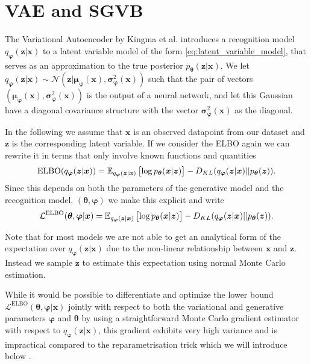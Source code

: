 \section{VAE and SGVB}

The Variational Autoencoder by Kingma et al. \cite{kingma_auto-encoding_2013}
introduces a recognition model $q_{\bm{\varphi}}(\bm{z} | \bm{x})$ to a latent
variable model of the form \eqref{eq:latent_variable_model}, that serves as
an approximation to the true posterior $p_{\bm{\theta}}( \bm{z} | \bm{x})$. We let $q_{\bm{\varphi}}(\bm{z} | \bm{x}) \sim
\mathcal{N}(\bm{z}| \bm{\mu_{\bm{\varphi}}}(\bm{x}),
\bm{\sigma}^2_{\bm{\varphi}}(\bm{x}))$ such that the pair of vectors
$(\bm{\mu}_{\bm{\varphi}}(\bm{x}), \bm{\sigma}^2_{\bm{\varphi}}(\bm{x}))$ is the
output of a neural network, and let this Gaussian have a diagonal covariance
structure with the vector $\bm{\sigma}^2_{\bm{\varphi}}(\bm{x})$ as the diagonal.

In the following we assume that $\bm{x}$ is an observed datapoint from our
dataset and $\bm{z}$ is the corresponding latent variable. If we consider the
ELBO again we can rewrite it in terms that only involve known functions and quantities
\begin{equation}
  \label{eq:ELBO_VAE}
  \text{ELBO}(q_{\bm{\varphi}}(\bm{z} | \bm{x})) = \operatorname{\mathbb{E}}_{q_{\bm{\varphi}}(\bm{z} | \bm{x})}\left[ \log p_{\bm{\theta}}(\bm{x} | \bm{z}) \right] - D_{KL}(q_{\bm{\varphi}}(\bm{z} | \bm{x}) || p_{\bm{\theta}}(\bm{z})).
\end{equation}
Since this depends on both the parameters of the generative model and the
recognition model, $(\bm{\theta}, \bm{\varphi})$ we make this explicit and write
\begin{equation}
  \label{eq:VAE_ELBO}
  \mathcal{L}^{\text{ELBO}}(\bm{\theta}, \bm{\varphi} | \bm{x}) = \operatorname{\mathbb{E}}_{q_{\bm{\varphi}}(\bm{z} | \bm{x})}\left[ \log p_{\bm{\theta}}(\bm{x} | \bm{z}) \right] - D_{KL}(q_{\bm{\varphi}}(\bm{z} | \bm{x}) || p_{\bm{\theta}}(\bm{z})).
\end{equation}

Note that for most models we are not able to get an analytical form of the
expectation over $q_{\bm{\varphi}}(\bm{z} | \bm{x})$ due to the non-linear
relationship between $\bm{x}$ and $\bm{z}$. Instead we sample $\bm{z}$ to
estimate this expectation using normal Monte Carlo estimation.

While it would be possible to differentiate and optimize the lower bound
$\mathcal{L}^{\text{ELBO}}(\bm{\theta}, \bm{\varphi} | \bm{x})$ jointly with
respect to both the variational and generative parameters $\bm{\varphi}$ and
$\bm{\theta}$ by using a straightforward Monte Carlo gradient estimator with respect
to $q_{\bm{\varphi}}(\bm{z} | \bm{x})$, this gradient exhibits very high
variance and is impractical compared to the reparametrisation trick which we will introduce below \cite{kingma_auto-encoding_2013}.

